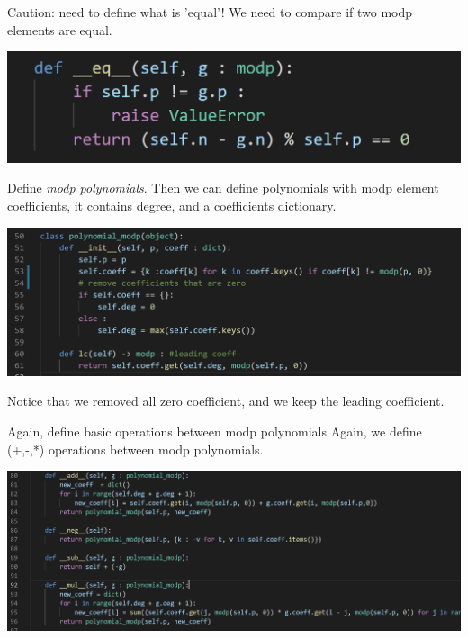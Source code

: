 \documentclass{beamer}
\begin{document}
\begin{frame}{Caution: need to define what is 'equal'!}
    We need to compare if two modp elements are equal.
    \begin{center}
        \includegraphics[scale = .5]{modpequal.png}
    \end{center}
\end{frame}

\begin{frame}{Define \emph{modp polynomials}.}
    Then we can define polynomials with modp element coefficients,
    it contains degree, and a coefficients dictionary.
    \begin{center}
        \includegraphics[scale = .5]{modppoly.png}
    \end{center} 
    Notice that we removed all zero coefficient, and we keep the leading coefficient. 
\end{frame}

\begin{frame}{Again, define basic operations between modp polynomials}
    Again, we define (+,-,*) operations between modp polynomials.
    \begin{center}
        \includegraphics[scale = .5]{polyoperation.png}
    \end{center}
\end{frame}
\end{document}
